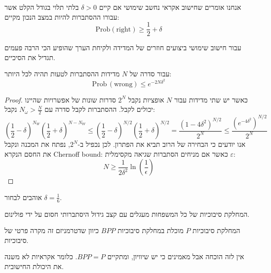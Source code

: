 \documentclass{tstextbook}
\begin{document}
\begin{definition}
אנחנו אומרים שחישוב אקראי נחשב שימושי אם קיים \(\delta>0\) בלתי תלוי בגודל הקלט אשר עבורו ההסתברות להיות במצב הנכון מקיים:
$$\mathrm{Prob}\left( \text{right} \right)\geq \frac{1}{2}+\delta$$

\end{definition}
\begin{corollary}
עבור חישוב שימושי ביצועים חוזרים של המדידה ולקיחת הערך שהופיע הכי הרבה פעמים תגדיל את הסיכיים.

\end{corollary}
\begin{proposition}
עבור סדרה של \(N\) מדידות ההסתברות לטעות תהיה לכל היותר:
$$\mathrm{Prob}\,(\mathrm{wrong})\leq e^{-2N\delta^{2}}$$

\end{proposition}
\begin{proof}
כאשר יש שתי מדידות עבור \(N\) אופציות נקבל \(2^{N}\) סדרות שונות של אפשרויות שהיינו יכולים לקבל. ההסתברות לקבל סדרה עם \(N_{\omega}> \frac{N}{2}\) נקבל:
$${\left({\frac{1}{2}}-\delta\right)^{N_{W}}\left({\frac{1}{2}}+\delta\right)^{N-N_{W}}}{\!\!\!\!\leq\left({\frac{1}{2}}-\delta\right)^{N/2}\!\left({\frac{1}{2}}+\delta\right)^{N/2}}\!\!\!\!=\frac{(1-4\delta^{2})^{N/2}}{2^{N}}\!\leq\!\frac{(e^{-4\delta^{2}})^{N/2}}{2^{N}}$$
אנו יודעים כי הבחירה של הרוב תביא את הפתרון. לכן נכפיל ב-\(2^{N}\), נפתח את המכנה ונקבל את החסם הנקרא Chernoff bound:
כאשר אם מניחים הסתברות שגיאה מקסימלית \(\varepsilon\):
$$N\geq{\frac{1}{2\delta^{2}}}\ln\left({\frac{1}{\epsilon}}\right)$$

\end{proof}
\begin{remark}
אוהבים לבחור \(\delta=\frac{1}{6}\). 

\end{remark}
\begin{definition}
המחלקת סיבוכיות של כל המשפחות מעגלים עם קצב גידול היסתברותי חסום על ידי פולינום.

\end{definition}
\begin{corollary}
המחלקת סיבוכיות \(P\) מוכלת במחלקת סיבוכיות \(BPP\) כיוון שדטרמניזם זה מקרה פרטי של סיבוכיות.

\end{corollary}
\begin{remark}
אין לזה הוכחה אבל מאמינים כי יש שיוויון, ומתקיים \(BPP=P\). כלומר אקראיות לא משנה את היכולת החישובית.

\end{remark}
\end{document}
